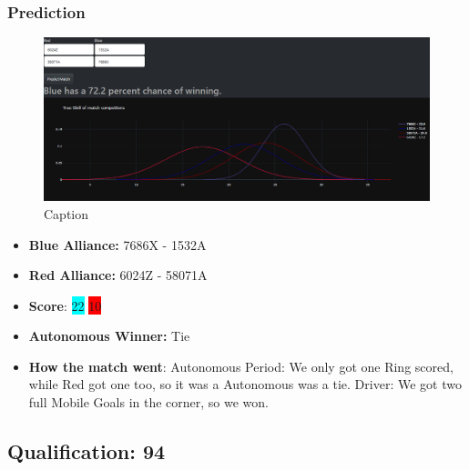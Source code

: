 \subsubsection*{Prediction}
\begin{figure}[H]
    \centering
    \includegraphics[width=0.8\linewidth]{images/Q84ND.png}
    \caption{Caption}
    \label{fig:enter-label}
\end{figure}
\begin{itemize}
    \item \textbf{Blue Alliance:} 7686X - 1532A 
    \item \textbf{Red Alliance:} 6024Z - 58071A
    \item \textbf{Score}: \colorbox{cyan}{22}
    \colorbox{red}{10}
    \item \textbf{Autonomous Winner:} Tie  
    \item \textbf{How the match went}: Autonomous Period: We only got one Ring scored, while Red got one too, so it was a Autonomous was a tie. Driver: We got two full Mobile Goals in the corner, so we won.
\end{itemize}

\subsection*{Qualification: 94}
